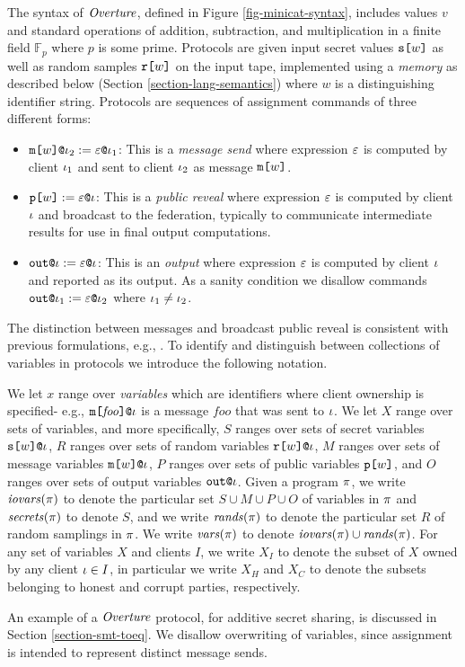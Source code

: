 The syntax of $\mathit{Overture}$, defined in Figure \ref{fig-minicat-syntax},
includes values $v$ and standard operations of addition, subtraction,
and multiplication in a finite field $\mathbb{F}_p$ where $p$ is some
prime.  Protocols are given input secret values $\texttt{s[}w\texttt{]}$ as well
as random samples $\texttt{r[}w\texttt{]}$ on the input tape, implemented using a
\emph{memory} as described below (Section
\ref{section-lang-semantics}) where $w$ is a distinguishing 
identifier string. Protocols are sequences of assignment commands of three
different forms:
\begin{itemize}
\item $\texttt{m[}w\texttt{]}\texttt{@}\iota_2 := \varepsilon\texttt{@}\iota_1$: This
  is a \emph{message send} where expression $\varepsilon$ is computed
  by client $\iota_1$ and sent to client $\iota_2$ as message
  $\texttt{m[}w\texttt{]}$.
\item $\texttt{p[}w\texttt{]} := \varepsilon\texttt{@}\iota$: This
  is a \emph{public reveal} where expression $\varepsilon$ is computed
  by client $\iota$ and broadcast to the federation, typically
  to communicate intermediate results for use in final output
  computations.
\item $\texttt{out}\texttt{@}\iota := \varepsilon\texttt{@}\iota$: This
  is an \emph{output} where expression $\varepsilon$ is computed
  by client $\iota$ and reported as its output. As a
  sanity condition we disallow commands
  $\texttt{out}\texttt{@}\iota_1 := \varepsilon\texttt{@}\iota_2$ where $\iota_1\ne\iota_2$.
\end{itemize}
The distinction between
messages and broadcast public reveal is consistent with previous
formulations, e.g., \cite{6266151}. To identify and distinguish
between collections of variables in protocols we introduce the
following notation.
\begin{definition}
We let $x$ range over \emph{variables} which are identifiers where
client ownership is specified- e.g.,
$\texttt{m[}\mathit{foo}\texttt{]}\texttt{@}\iota$ is a message $\mathit{foo}$ that
was sent to $\iota$. We let $X$ range over sets of variables, and more
specifically, $S$ ranges over sets of secret variables
$\texttt{s[}w\texttt{]}\texttt{@}\iota$, $R$ ranges over sets of random variables
$\texttt{r[}w\texttt{]}\texttt{@}\iota$, $M$ ranges over sets of message variables
$\texttt{m[}w\texttt{]}\texttt{@}\iota$, $P$ ranges over sets of public variables
$\texttt{p[}w\texttt{]}$, and $O$ ranges over sets of output variables $\texttt{out}\texttt{@}\iota$.
Given a program $\pi$, we write $\mathit{iovars}(\pi)$ to denote the
particular set $S \cup M \cup P \cup O$ of variables in $\pi$ and
$\mathit{secrets}(\pi)$ to denote $S$, and we write $\mathit{rands}(\pi)$ to
denote the particular set $R$ of random samplings in $\pi$. We write
$\mathit{vars}(\pi)$ to denote $\mathit{iovars}(\pi) \cup \mathit{rands}(\pi)$. For any set
of variables $X$ and clients $I$, we write $X_I$ to denote the subset
of $X$ owned by any client $\iota \in I$, in particular we write $X_H$
and $X_C$ to denote the subsets belonging to honest and corrupt
parties, respectively.
\end{definition}
An example of a $\mathit{Overture}$ protocol, for additive secret sharing, is
discussed in Section \ref{section-smt-toeq}.  We disallow overwriting
of variables, since assignment is intended to represent distinct
message sends.

